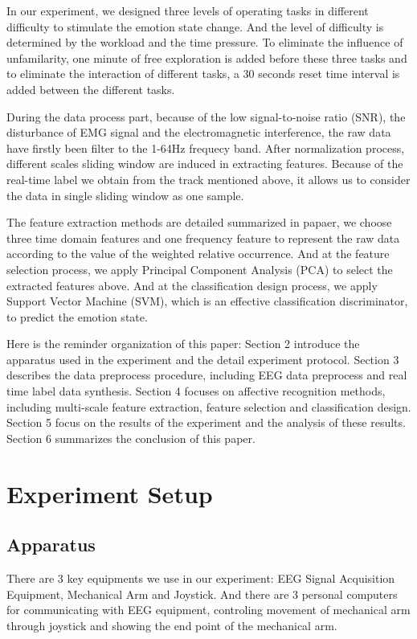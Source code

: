 \documentclass[runningheads,a4paper]{llncs}
\begin{document}
In our experiment, we designed three levels of operating tasks in different difficulty to
stimulate the emotion state change. And the level of difficulty is determined by the
workload and the time pressure. To eliminate the influence of unfamilarity, one minute
of free exploration is added before these three tasks and to eliminate the interaction
of different tasks, a 30 seconds reset time interval is added between the different
tasks.

During the data process part, because of the low signal-to-noise ratio (SNR),
the disturbance of EMG signal and the electromagnetic interference, the raw data
have firstly been filter to the 1-64Hz frequecy band\cite{Feature}. After normalization
process, different scales sliding window are induced in extracting features. Because of
the real-time label we obtain from the track mentioned above, it allows us to consider the
data in single sliding window as one sample.

The feature extraction methods are detailed summarized in papaer\cite{Feature}, we choose
three time domain features and one frequency feature to represent the raw data according
to the value of the weighted relative occurrence. And at the feature selection process,
we apply Principal Component Analysis (PCA) to
select the extracted features above. And at the classification design process, we apply
Support Vector Machine (SVM), which is an effective classification discriminator,
to predict the emotion state.

Here is the reminder organization of this paper: Section 2 introduce the
apparatus used in the experiment and the detail experiment protocol. Section 3
describes the data preprocess procedure, including EEG data preprocess and
real time label data synthesis. Section 4 focuses on affective recognition methods,
including multi-scale feature extraction, feature selection and
classification design. Section 5 focus on the results of the experiment and
the analysis of these results. Section 6 summarizes the conclusion of this paper.

\section{Experiment Setup}
\subsection{Apparatus}
There are 3 key equipments we use in our experiment: EEG Signal Acquisition Equipment,
Mechanical Arm and Joystick. And there are 3 personal computers for communicating
with EEG equipment, controling movement of mechanical arm through joystick and
showing the end point of the mechanical arm.
\end{document}
